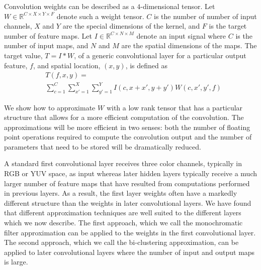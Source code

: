 Convolution weights can be described as a $4$-dimensional tensor. Let $W \in \mathbb{R}^{C \times X \times Y \times F}$ 
denote such a weight tensor. $C$ is the number of number of input channels, $X$ and $Y$ are the special dimensions of the kernel, and $F$ is the target number of feature maps.
Let $I \in \mathbb{R}^{C \times N \times M}$ denote an input signal where $C$ is the number of input maps, and $N$ and $M$ are the spatial dimensions of the maps.
The target value, $T = I \ast W$, of a generic convolutional layer for a particular output feature, $f$, and spatial location, $(x, y)$, is defined as
\begin{align*}
\label{convlayereq}
&T(f,x,y) = \\
&\sum_{c=1}^C \sum_{x'=1}^{X} \sum_{y'=1}^{Y} I(c,x+x',y+y') W(c,x',y',f)
\end{align*}

We show how to approximate $W$ with a low rank tensor that has a particular structure that allows for a more efficient computation of the convolution. The approximations will be more efficient in two senses: both the number of floating point operations required to compute the convolution output and the number of parameters that need to be stored will be dramatically reduced. 

A standard first convolutional layer receives three color channels, typically in RGB or YUV space, as input whereas later hidden layers typically receive a much larger number of feature maps that have resulted from computations performed in previous layers. As a result, the first layer weights often have a markedly different structure than the weights in later convolutional layers. We have found that different approximation techniques are well suited to the different layers which we now describe. The first approach, which we call the monochromatic filter approximation can be applied to the weights in the first convolutional layer. The second approach, which we call the bi-clustering approximation,  can be applied to later convolutional layers where the number of input and output maps is large. 
